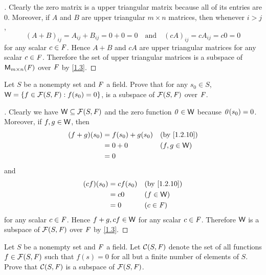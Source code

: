 \begin{proof}[]
  Clearly the zero matrix is a upper triangular matrix because all of its entries are \(0\).
  Moreover, if \(A\) and \(B\) are upper triangular \(m \times n\) matrices, then whenever \(i > j\),
  \[
    (A + B)_{i j} = A_{i j} + B_{i j} = 0 + 0 = 0 \quad \text{and} \quad (cA)_{i j} = cA_{i j} = c0 = 0
  \]
  for any scalar \(c \in \mathit{F}\).
  Hence \(A + B\) and \(cA\) are upper triangular matrices for any scalar \(c \in \mathit{F}\).
  Therefore the set of upper triangular matrices is a subspace of \(\ms\) over \(\mathit{F}\) by \cref{1.3}.
\end{proof}

\begin{ex}\label{ex:1.3.13}
  Let \(S\) be a nonempty set and \(\mathit{F}\) a field.
  Prove that for any \(s_0 \in S\), \(\mathsf{W} = \left\lbrace f \in \mathcal{F}(S, \mathit{F}) : f(s_0) = 0\right\rbrace\), is a subspace of \(\mathcal{F}(S, \mathit{F})\) over \(\mathit{F}\).
\end{ex}

\begin{proof}[]
  Clearly we have \(\mathsf{W} \subseteq \mathcal{F}(S, \mathit{F})\) and the zero function \(\mathit{0} \in \mathsf{W}\) because \(\mathit{0}(s_0) = 0\).
  Moreover, if \(f, g \in \mathsf{W}\), then
  \begin{align*}
    (f + g)(s_0) & = f(s_0) + g(s_0) &  & \by{1.2.10}   \\
                 & = 0 + 0           &  & (f, g \in \W) \\
                 & = 0
  \end{align*}
  and
  \begin{align*}
    (cf)(s_0) & = cf(s_0) &  & \by{1.2.10} \\
              & = c0      &  & (f \in \W)  \\
              & = 0       &  & (c \in \F)
  \end{align*}
  for any scalar \(c \in \mathit{F}\).
  Hence \(f + g, cf \in \mathsf{W}\) for any scalar \(c \in \mathit{F}\).
  Therefore \(\mathsf{W}\) is a subspace of \(\mathcal{F}(S, \mathit{F})\) over \(\mathit{F}\) by \cref{1.3}.
\end{proof}

\begin{ex}\label{ex:1.3.14}
  Let \(S\) be a nonempty set and \(\mathit{F}\) a field.
  Let \(\mathcal{C}(S, \mathit{F})\) denote the set of all functions \(f \in \mathcal{F}(S, \mathit{F})\) such that \(f(s) = 0\) for all but a finite number of elements of \(S\).
  Prove that \(\mathcal{C}(S, \mathit{F})\) is a subspace of \(\mathcal{F}(S, \mathit{F})\).
\end{ex}

